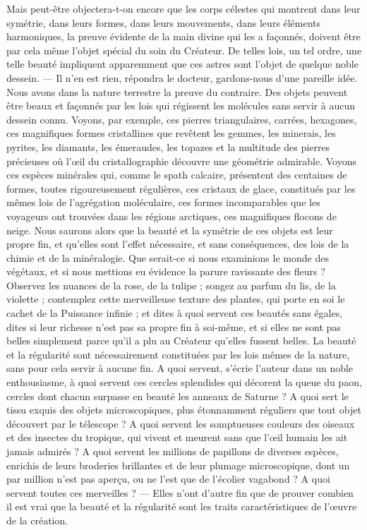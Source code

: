 \documentclass[a4paper, 11pt, oneside, landscape]{article}
\begin{document}
Mais peut-être objectera-t-on encore que les corps célestes qui montrent dans leur symétrie, dans leurs formes, dans leurs mouvements, dans leurs éléments harmoniques, la preuve évidente de la main divine qui les a façonnés, doivent être par cela même l'objet spécial du soin du Créateur. De telles lois, un tel ordre, une telle beauté impliquent apparemment que ces astres sont l'objet de quelque noble dessein. --- Il n'en est rien, répondra le docteur, gardons-nous d'une pareille idée. Nous avons dans la nature terrestre la preuve du contraire. Des objets peuvent être beaux et façonnés par les lois qui régissent les molécules sans servir à aucun dessein connu. Voyons, par exemple, ces pierres triangulaires, carrées, hexagones, ces magnifiques formes cristallines que revêtent les gemmes, les minerais, les pyrites, les diamants, les émeraudes, les topazes et la multitude des pierres précieuses où l'œil du cristallographie découvre une géométrie admirable. Voyons ces espèces minérales qui, comme le spath calcaire, présentent des centaines de formes, toutes rigoureusement régulières, ces cristaux de glace, constitués par les mêmes lois de l'agrégation moléculaire, ces formes incomparables que les voyageurs ont trouvées dans les régions arctiques, ces magnifiques flocons de neige. Nous saurons alors que la beauté et la symétrie de ces objets est leur propre fin, et qu'elles sont l'effet nécessaire, et sans conséquences, des lois de la chimie et de la minéralogie. Que serait-ce si nous examinions le monde des végétaux, et si nous mettions eu évidence la parure ravissante des fleurs ? Observez les nuances de la rose, de la tulipe ; songez au parfum du lis, de la violette ; contemplez cette merveilleuse texture des plantes, qui porte en soi le cachet de la Puissance infinie ; et dites à quoi servent ces beautés sans égales, dites si leur richesse n'est pas sa propre fin à soi-même, et si elles ne sont pas belles simplement parce qu'il a plu au Créateur qu'elles fussent belles. La beauté et la régularité sont nécessairement constituées par les lois mêmes de la nature, sans pour cela servir à aucune fin. A quoi servent, s'écrie l'auteur dans un noble enthousiasme, à quoi servent ces cercles splendides qui décorent la queue du paon, cercles dont chacun surpasse en beauté les anneaux de Saturne ? A quoi sert le tissu exquis des objets microscopiques, plus étonnamment réguliers que tout objet découvert par le télescope ? A quoi servent les somptueuses couleurs des oiseaux et des insectes du tropique, qui vivent et meurent sans que l'œil humain les ait jamais admirés ? A quoi servent les millions de papillons de diverses espèces, enrichis de leurs broderies brillantes et de leur plumage microscopique, dont un par million n'est pas aperçu, ou ne l'est que de l'écolier vagabond ? A quoi servent toutes ces merveilles ? --- Elles n'ont d'autre fin que de prouver combien il est vrai que la beauté et la régularité sont les traits caractéristiques de l'œuvre de la création.
\end{document}
